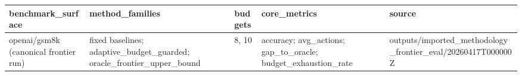 \begin{tabular}{lllll}
\hline
benchmark_surface & method_families & budgets & core_metrics & source \\
\hline
openai/gsm8k (canonical frontier run) & fixed baselines; adaptive_budget_guarded; oracle_frontier_upper_bound & 8, 10 & accuracy; avg_actions; gap_to_oracle; budget_exhaustion_rate & outputs/imported_methodology_frontier_eval/20260417T000000Z \\
\hline
\end{tabular}
